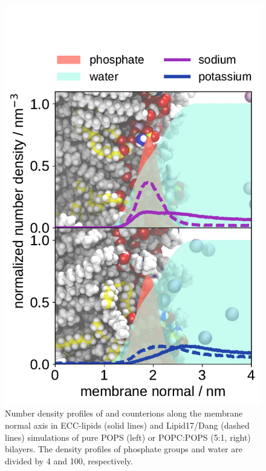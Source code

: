 \documentclass[journal=jpcbfk,manuscript=article]{achemso}
\newlength{\figheight}
\begin{document}
\begin{figure}[tbp!]
  \includegraphics[height=\figheight]{../img/ecc_pops/density_profiles_na-k-counterions_wat_phos_compar_5PC-1PS_ecclipids-lipid17.pdf}
  \caption{\label{fig:POPS-counterions-dens}
    Number density profiles of  and  counterions along the membrane normal axis
    in ECC-lipids (solid lines) and Lipid17/Dang (dashed lines) simulations of pure POPS (left) or POPC:POPS (5:1, right) bilayers.  
    The density profiles of phosphate groups and water are divided by 4 and 100, respectively.  
}
\end{figure} 
\end{document}
